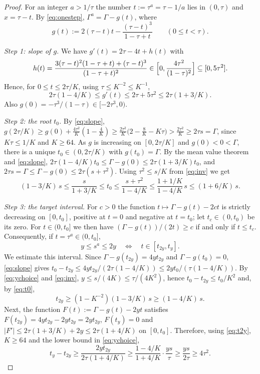 \documentclass[11pt]{amsart}
\theoremstyle{definition}
\theoremstyle{remark}
\begin{document}
\begin{proof}
For an integer $a>1/\tau$ the number $t:=\tau^a=\tau-1/a$ lies in $(0,\tau)$ and
$x=\tau-t$. By \eqref{eq:onestep}, $\Gamma^a=\Gamma-g(t)$, where
\[
g(t):=2(\tau-t)t-\frac{(\tau-t)^3}{1-\tau+t}\qquad(0\le t<\tau).
\]

\emph{Step 1: slope of $g$.} We have $g'(t)=2\tau-4t+h(t)$ with
\[
h(t)=\frac{3(\tau-t)^2(1-\tau+t)+(\tau-t)^3}{(1-\tau+t)^2}\in\Bigl[0,\frac{4\tau^2}{(1-\tau)^2}\Bigr]
\subseteq[0,5\tau^2].
\]
Hence, for $0\le t\le 2\tau/K$, using $\tau\le K^{-2}\le K^{-1}$,
\begin{equation}\label{eq:slope}
2\tau(1-4/K)\le g'(t)\le 2\tau+5\tau^2\le 2\tau(1+3/K).
\end{equation}
Also $g(0)=-\tau^3/(1-\tau)\in[-2\tau^3,0)$.

\emph{Step 2: the root $t_0$.} By \eqref{eq:slope},
$g(2\tau/K)\ge g(0)+\frac{4\tau^2}{K}(1-\frac4K)\ge\frac{2\tau^2}{K}\bigl(2-\frac8K-K\tau\bigr)
>\frac{2\tau^2}{K}\ge2\tau s=\Gamma$, since $K\tau\le 1/K$ and $K\ge64$. As $g$ is
increasing on $[0,2\tau/K]$ and $g(0)<0<\Gamma$, there is a unique $t_0\in(0,2\tau/K)$
with $g(t_0)=\Gamma$. By the mean value theorem and \eqref{eq:slope},
$2\tau(1-4/K)t_0\le\Gamma-g(0)\le 2\tau(1+3/K)t_0$, and
$2\tau s=\Gamma\le\Gamma-g(0)\le 2\tau(s+\tau^2)$. Using $\tau^2\le s/K$ from
\eqref{eq:inv} we get
\begin{equation}\label{eq:t0}
(1-3/K)\,s\le\frac{s}{1+3/K}\le t_0\le\frac{s+\tau^2}{1-4/K}\le\frac{1+1/K}{1-4/K}\,s\le(1+6/K)\,s .
\end{equation}

\emph{Step 3: the target interval.} For $c>0$ the function $t\mapsto\Gamma-g(t)-2ct$ is
strictly decreasing on $[0,t_0]$, positive at $t=0$ and negative at $t=t_0$; let
$t_c\in(0,t_0)$ be its zero. For $t\in(0,t_0]$ we then have
$(\Gamma-g(t))/(2t)\ge c$ if and only if $t\le t_c$. Consequently, if $t=\tau^a\in(0,t_0]$,
\begin{equation}\label{eq:window}
y\le s^a\le2y\quad\Longleftrightarrow\quad t\in[t_{2y},t_y].
\end{equation}
We estimate this interval. Since $\Gamma-g(t_{2y})=4yt_{2y}$ and $\Gamma-g(t_0)=0$,
\eqref{eq:slope} gives $t_0-t_{2y}\le 4yt_{2y}/(2\tau(1-4/K))\le 2yt_0/(\tau(1-4/K))$.
By \eqref{eq:ychoice} and \eqref{eq:inv}, $y\le s/(4K)\le\tau/(4K^2)$, hence
$t_0-t_{2y}\le t_0/K^2$ and, by \eqref{eq:t0},
\begin{equation}\label{eq:t2y}
t_{2y}\ge(1-K^{-2})(1-3/K)\,s\ge(1-4/K)\,s .
\end{equation}
Next, the function $F(t):=\Gamma-g(t)-2yt$ satisfies $F(t_{2y})=4yt_{2y}-2yt_{2y}=2yt_{2y}$,
$F(t_y)=0$ and $|F'|\le 2\tau(1+3/K)+2y\le2\tau(1+4/K)$ on $[0,t_0]$. Therefore, using
\eqref{eq:t2y}, $K\ge64$ and the lower bound in \eqref{eq:ychoice},
\[
t_y-t_{2y}\ge\frac{2yt_{2y}}{2\tau(1+4/K)}\ge\frac{1-4/K}{1+4/K}\cdot\frac{ys}{\tau}
\ge\frac{ys}{2\tau}\ge4\tau^2 .
\]


\end{proof}
\end{document}
